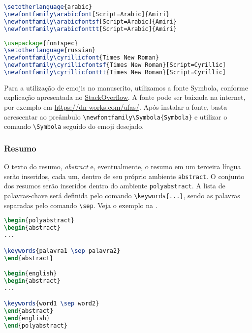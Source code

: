 \documentclass[portuguese]{textolivre}
\begin{document}
\begin{lstlisting}[language=tex, label=lst-setlang-arabic, caption={Código para acrescentar ao preâmbulo para prover o suporte a árabe no texto.}]
\setotherlanguage{arabic}
\newfontfamily\arabicfont[Script=Arabic]{Amiri}
\newfontfamily\arabicfontsf[Script=Arabic]{Amiri}
\newfontfamily\arabicfonttt[Script=Arabic]{Amiri}
\end{lstlisting} %

\begin{lstlisting}[language=tex, label=lst-setlang-russian, caption={Código para acrescentar ao preâmbulo para prover o suporte a russo no texto.}]
\usepackage{fontspec}
\setotherlanguage{russian}
\newfontfamily\cyrillicfont{Times New Roman}
\newfontfamily\cyrillicfontsf{Times New Roman}[Script=Cyrillic]
\newfontfamily\cyrillicfonttt{Times New Roman}[Script=Cyrillic]
\end{lstlisting} %

Para a utilização de emojis no manuscrito, utilizamos a fonte Symbola, conforme explicação
apresentada no \href{https://stackoverflow.com/questions/190145/how-to-insert-emoticons-in-latex/57076064}{StackOverflow}.
A fonte pode ser baixada na internet, por exemplo em \url{https://dn-works.com/ufas/}.
Após instalar a fonte, basta acrescentar ao preâmbulo \verb|\newfontfamily\Symbola{Symbola}|
e utilizar o comando \verb|\Symbola| seguido do emoji desejado.



\subsubsection{Resumo}\label{sec-resumo}
O texto do resumo, \emph{abstract} e, eventualmente, o resumo em um terceira língua serão inseridos, cada um,
dentro de seu próprio ambiente \verb|abstract|. O conjunto dos resumos serão inseridos dentro do ambiente \verb|polyabstract|.
A lista de palavras-chave será definida pelo comando \verb|\keywords{...}|, sendo as palavras separadas pelo
comando \verb|\sep|. Veja o exemplo na .
\begin{lstlisting}[language=tex, label=lst-abstract, caption={Como definir os resumos e palavras chaves em várias línguas.}]
\begin{polyabstract}
\begin{abstract}
...

\keywords{palavra1 \sep palavra2}
\end{abstract}

\begin{english}
\begin{abstract}
...

\keywords{word1 \sep word2}
\end{abstract}
\end{english}
\end{polyabstract}
\end{lstlisting} %
\end{document}
